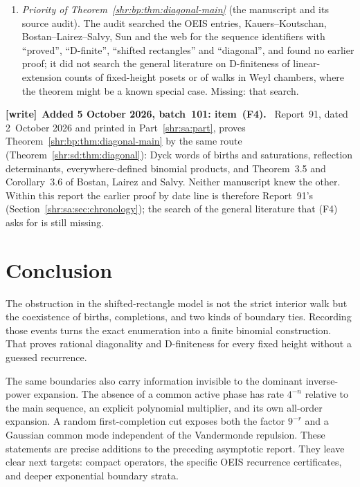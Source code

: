 \documentclass[11pt,letterpaper]{article}
\numberwithin{equation}{section}
\theoremstyle{definition}
\newcommand{\1}{\mathbf 1}
\newenvironment{writenote}[1][]{\par\smallskip\begingroup\small
 \noindent\textbf{[write]}\if\relax\detokenize{#1}\relax\else~\textbf{#1.}\fi\ }%
 {\par\endgroup\smallskip}
\begin{document}
\begin{enumerate}[label=(F\arabic*),leftmargin=*]
whose constant $C_{m,L}$ and threshold for ``sufficiently large $y$'' are
existential (Research question~14 asks for explicit ones).
\item \emph{Priority of Theorem~\ref{shr:bp:thm:diagonal-main}} (the
manuscript and its source audit). The audit searched the OEIS entries,
Kauers--Koutschan, Bostan--Lairez--Salvy, Sun and the web for the sequence
identifiers with ``proved'', ``D-finite'', ``shifted rectangles'' and
``diagonal'', and found no earlier proof; it did not search the general
literature on D-finiteness of linear-extension counts of fixed-height
posets or of walks in Weyl chambers, where the theorem might be a known
special case. Missing: that search.
\end{enumerate}

\begin{writenote}[Added 5 October 2026, batch~101: item~(F4)]
Report~91, dated 2~October 2026 and printed in Part~\ref{shr:sa:part},
proves Theorem~\ref{shr:bp:thm:diagonal-main} by the same route
(Theorem~\ref{shr:sd:thm:diagonal}): Dyck words of births and saturations,
reflection determinants, everywhere-defined binomial products, and
Theorem~3.5 and Corollary~3.6 of Bostan, Lairez and Salvy. Neither
manuscript knew the other. Within this report the earlier proof by date
line is therefore Report~91's (Section~\ref{shr:sa:sec:chronology}); the
search of the general literature that (F4) asks for is still missing.
\end{writenote}

\section{Conclusion}
The obstruction in the shifted-rectangle model is not the strict
interior walk but the coexistence of births, completions, and two kinds
of boundary ties. Recording those events turns the exact enumeration into
a finite binomial construction. That proves rational diagonality and
D-finiteness for every fixed height without a guessed recurrence.

The same boundaries also carry information invisible to the dominant
inverse-power expansion. The absence of a common active phase has rate
$4^{-n}$ relative to the main sequence, an explicit polynomial multiplier,
and its own all-order expansion. A random first-completion cut exposes
both the factor $9^{-r}$ and a Gaussian common mode independent of the
Vandermonde repulsion. These statements are precise additions to the
preceding asymptotic report. They leave clear next targets: compact
operators, the specific OEIS recurrence certificates, and deeper
exponential boundary strata.
\end{document}
